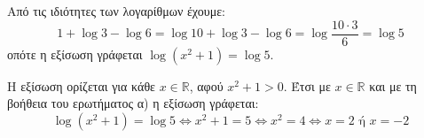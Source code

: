 \begin{alist}
\item Από τις ιδιότητες των λογαρίθμων έχουμε:
\[1 + \log 3 - \log 6 = \log 10 + \log 3 - \log 6 = \log \frac{10 \cdot 3}{6} = \log 5\]
οπότε η εξίσωση γράφεται $\log(x^2 + 1) = \log 5$.
\item Η εξίσωση ορίζεται για κάθε $x \in \mathbb{R}$, αφού $x^2 + 1 > 0$. Έτσι με $x \in \mathbb{R}$ και με τη βοήθεια του ερωτήματος α) η εξίσωση γράφεται:
\[\log(x^2 + 1) = \log 5 \Leftrightarrow x^2 + 1 = 5 \Leftrightarrow x^2 = 4 \Leftrightarrow x = 2 \text{ ή } x = -2\]
\end{alist}

